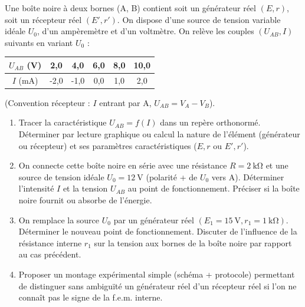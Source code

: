 \documentclass[11pt]{article}
\begin{document}
\begin{exercice}
Une boîte noire à deux bornes (A, B) contient soit un générateur réel $(E, r)$, soit un récepteur réel $(E', r')$. On dispose d'une source de tension variable idéale $U_0$, d'un ampèremètre et d'un voltmètre. On relève les couples $(U_{AB}, I)$ suivants en variant $U_0$ :
\begin{center}
\begin{tabular}{c|ccccc}
$U_{AB}$ (\si{\volt}) & 2,0 & 4,0 & 6,0 & 8,0 & 10,0 \\
\hline
$I$ (\si{\milli\ampere}) & -2,0 & -1,0 & 0,0 & 1,0 & 2,0
\end{tabular}
\end{center}
(Convention récepteur : $I$ entrant par A, $U_{AB} = V_A - V_B$).
\begin{enumerate}
    \item Tracer la caractéristique $U_{AB} = f(I)$ dans un repère orthonormé. Déterminer par lecture graphique ou calcul la nature de l'élément (générateur ou récepteur) et ses paramètres caractéristiques ($E, r$ ou $E', r'$).
    \item On connecte cette boîte noire en série avec une résistance $R = \SI{2}{\kilo\ohm}$ et une source de tension idéale $U_0 = \SI{12}{\volt}$ (polarité + de $U_0$ vers A). Déterminer l'intensité $I$ et la tension $U_{AB}$ au point de fonctionnement. Préciser si la boîte noire fournit ou absorbe de l'énergie.
    \item On remplace la source $U_0$ par un générateur réel $(E_1 = \SI{15}{\volt}, r_1 = \SI{1}{\kilo\ohm})$. Déterminer le nouveau point de fonctionnement. Discuter de l'influence de la résistance interne $r_1$ sur la tension aux bornes de la boîte noire par rapport au cas précédent.
    \item Proposer un montage expérimental simple (schéma + protocole) permettant de distinguer sans ambiguïté un générateur réel d'un récepteur réel si l'on ne connaît pas le signe de la f.e.m. interne.
\end{enumerate}
\end{exercice}
\end{document}
